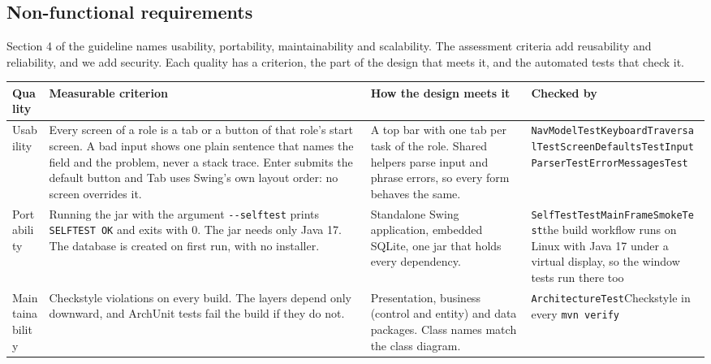 \subsection*{Non-functional requirements}

Section 4 of the guideline names usability, portability, maintainability and
scalability. The assessment criteria add reusability and reliability, and we
add security. Each quality has a criterion, the part of the design
that meets it, and the automated tests that check it.

\begingroup
\raggedright
\begin{longtable}{@{}>{\raggedright\arraybackslash}p{2.8cm}>{\raggedright\arraybackslash}p{4.1cm}>{\raggedright\arraybackslash}p{3.5cm}>{\raggedright\arraybackslash}p{4.0cm}@{}}
\toprule
\textbf{Quality} & \textbf{Measurable criterion} & \textbf{How the design meets it} & \textbf{Checked by}\\
\midrule
\endhead
Usability & Every screen of a role is a tab or a button of that role's start screen. A bad input shows one plain sentence that names the field and the problem, never a stack trace. Enter submits the default button and Tab uses Swing's own layout order: no screen overrides it. & A top bar with one tab per task of the role. Shared helpers parse input and phrase errors, so every form behaves the same. & \footnotesize \texttt{NavModelTest}\newline \texttt{KeyboardTraversalTest}\newline \texttt{ScreenDefaultsTest}\newline \texttt{InputParserTest}\newline \texttt{ErrorMessagesTest}\\
Portability & Running the jar with the argument \texttt{-{}-selftest} prints \texttt{SELFTEST OK} and exits with 0. The jar needs only Java 17. The database is created on first run, with no installer. & Standalone Swing application, embedded SQLite, one jar that holds every dependency. & \footnotesize \texttt{SelfTestTest}\newline \texttt{MainFrameSmokeTest}\newline the build workflow runs on Linux with Java 17 under a virtual display, so the window tests run there too\\
Maintainability & 0 Checkstyle violations on every build. The layers depend only downward, and ArchUnit tests fail the build if they do not. & Presentation, business (control and entity) and data packages. Class names match the class diagram. & \footnotesize \texttt{ArchitectureTest}\newline Checkstyle in every \texttt{mvn verify}\\

\end{longtable}
